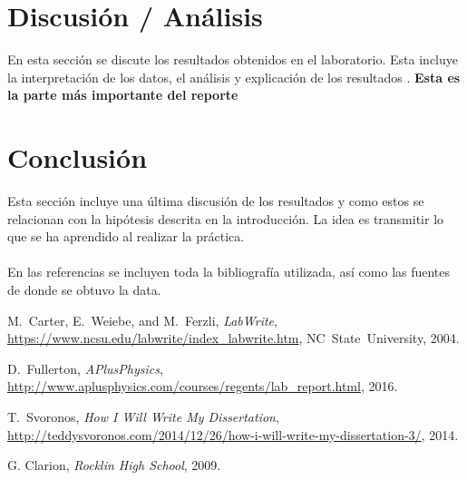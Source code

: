 \documentclass[article, 11pt]{IEEEtran}   %
\begin{document}
\section{Discusi\'on / An\'alisis}
En esta secci\'on se discute los resultados obtenidos en el laboratorio. Esta incluye la interpretaci\'on de los datos, el an\'alisis y explicaci\'on de los resultados . \textbf{Esta es la parte m\'as importante del reporte}

\section{Conclusi\'on}
Esta secci\'on incluye una \'ultima discusi\'on de los resultados y como estos se relacionan con la hip\'otesis descrita en la introducci\'on.
La idea es transmitir lo que se ha aprendido al realizar la pr\'actica.\\ \\
En las referencias se incluyen toda la bibliograf\'ia utilizada, as\'i como las fuentes de donde se obtuvo la data.
\begin{thebibliography}{1}

M.~Carter, E.~Weiebe, and M.~Ferzli, \emph{LabWrite}, \url{https://www.ncsu.edu/labwrite/index_labwrite.htm}, NC~State~University, 2004.

D.~Fullerton, \emph{APlusPhysics}, \url{http://www.aplusphysics.com/courses/regents/lab_report.html}, 2016.

T.~Svoronos, \emph{How I Will Write My Dissertation}, \url{http://teddysvoronos.com/2014/12/26/how-i-will-write-my-dissertation-3/}, 2014.

G. Clarion, \emph{Rocklin High School}, 2009.

\end{thebibliography}
\end{document}
